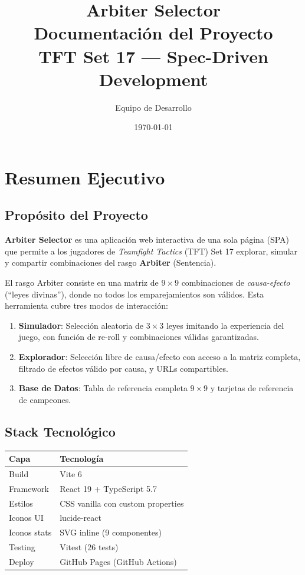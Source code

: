 \documentclass[11pt,a4paper]{report}
\title{\vspace{2cm}\Huge\textbf{Arbiter Selector}\\[0.5cm]
  \Large Documentación del Proyecto\\[0.3cm]
  \normalsize TFT Set 17 — Spec-Driven Development}
\author{Equipo de Desarrollo}
\date{\today}
\begin{document}
\maketitle
\thispagestyle{empty}
\cleardoublepage

\tableofcontents
\cleardoublepage

\chapter{Resumen Ejecutivo}

\section{Propósito del Proyecto}

\textbf{Arbiter Selector} es una aplicación web interactiva de una sola página (SPA) que permite a los jugadores de \textit{Teamfight Tactics} (TFT) Set 17 explorar, simular y compartir combinaciones del rasgo \textbf{Arbiter} (Sentencia).

El rasgo Arbiter consiste en una matriz de $9 \times 9$ combinaciones de \textit{causa-efecto} (``leyes divinas''), donde no todos los emparejamientos son válidos. Esta herramienta cubre tres modos de interacción:

\begin{enumerate}
  \item \textbf{Simulador}: Selección aleatoria de $3 \times 3$ leyes imitando la experiencia del juego, con función de re-roll y combinaciones válidas garantizadas.
  \item \textbf{Explorador}: Selección libre de causa/efecto con acceso a la matriz completa, filtrado de efectos válido por causa, y URLs compartibles.
  \item \textbf{Base de Datos}: Tabla de referencia completa $9 \times 9$ y tarjetas de referencia de campeones.
\end{enumerate}

\section{Stack Tecnológico}

\begin{table}[h]
\centering
\begin{tabular}{@{}ll@{}}
\toprule
\textbf{Capa} & \textbf{Tecnología} \\
\midrule
Build & Vite 6 \\
Framework & React 19 + TypeScript 5.7 \\
Estilos & CSS vanilla con custom properties \\
Iconos UI & lucide-react \\
Iconos stats & SVG inline (9 componentes) \\
Testing & Vitest (26 tests) \\
Deploy & GitHub Pages (GitHub Actions) \\
\bottomrule
\end{tabular}
\end{table}
\end{document}
